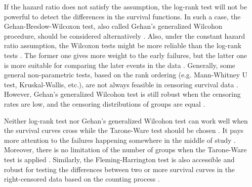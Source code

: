 If the hazard ratio does not satisfy the assumption, the log-rank test
will not be powerful to detect the differences in the survival
functions. In such a case, the Gehan-Breslow-Wilcoxon test, also
called Gehan’s generalized Wilcohon procedure, should be considered
alternatively \cite{agarwal2012statistics}. Also, under the constant
hazard ratio assumption, the Wilcoxon tests might be more reliable
than the log-rank tests \cite{custodio2007diagnostics}. The former one
gives more weight to the early failures, but the latter one is more
suitable for comparing the later events in the data
\cite{custodio2007diagnostics}. Generally, some general non-parametric
tests, based on the rank ordering (e.g. Mann-Whitney U test,
Kruskal-Wallis, etc.), are not always feasible in censoring survival
data \cite{agarwal2012statistics}. However, Gehan’s generalized
Wilcohon test is still robust when the censoring rates are low, and
the censoring distributions of groups are equal
\cite{karadeniz2017examining}.


Neither log-rank test nor Gehan’s generalized Wilcohon test can work
well when the survival curves cross while the Tarone-Ware test should
be chosen \cite{leton2001equivalence}. It pays more attention to the
failures happening somewhere in the middle of study
\cite{etikan2017kaplan}. Moreover, there is no limitation of the
number of groups when the Tarone-Ware test is applied
\cite{custodio2007diagnostics}. Similarly, the Fleming-Harrington test
is also accessible and robust for testing the differences between two
or more survival curves in the right-censored data based on the
counting process \cite{harrington1982class}.














